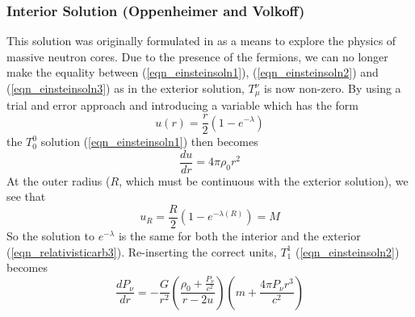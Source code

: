 \subsubsection{Interior Solution (Oppenheimer and Volkoff)}
This solution was originally formulated in \cite{ref_oppenheimervolkoff} as a means to explore the physics of massive neutron
cores. Due to the presence of the fermions, we can no longer make the equality between (\ref{eqn_einsteinsoln1}),
(\ref{eqn_einsteinsoln2}) and (\ref{eqn_einsteinsoln3}) as in the exterior solution, $T_\mu^\nu$ is now non-zero. By using a
trial and error approach and introducing a variable which has the form
\begin{equation}
	u(r) = \frac{r}{2}\left(1-e^{-\lambda}\right)
	\label{eqn_relativisticarb4}
\end{equation}
the $T_0^0$ solution (\ref{eqn_einsteinsoln1}) then becomes
\begin{equation}
	\frac{du}{dr} = 4 \pi \rho_0 r^2
	\label{eqn_relativisticarb5}
\end{equation}
At the outer radius ($R$, which must be continuous with the exterior solution), we see that
\begin{equation}
	u_R = \frac{R}{2}\left(1-e^{-\lambda(R)}\right) = M
	\label{eqn_relativisticarb6}
\end{equation}
So the solution to $e^{-\lambda}$ is the same for both the interior and the exterior (\ref{eqn_relativisticarb3}). Re-inserting the
correct units, $T_1^1$ (\ref{eqn_einsteinsoln2}) becomes
\begin{equation}
	\frac{dP_\nu}{dr} = - \frac{G}{r^2} \left(\frac{ \rho_0+ \frac{P_\nu}{c^2}}{r-2u}\right) \left( m + \frac{4 \pi P_\nu r^3}{c^2} \right)
	\label{eqn_relativisticarb7}
\end{equation}

